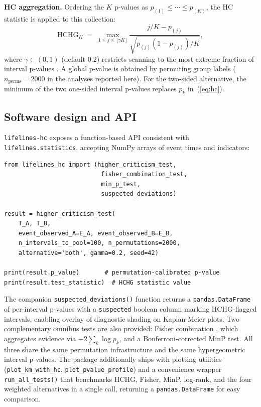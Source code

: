 \documentclass[unnumsec,webpdf,contemporary,large]{oup-authoring-template}
\begin{document}
\textbf{HC aggregation.}
Ordering the $K$ p-values as $p_{(1)} \leq \cdots \leq p_{(K)}$, the
HC statistic \citep{donoho2004,donoho2015special} is applied to this collection:
%
\begin{equation}\label{eq:hc}
  \mathrm{HCHG}_K
  \;=\;
  \max_{1 \leq j \leq \lfloor\gamma K\rfloor}
  \frac{j/K - p_{(j)}}{\sqrt{p_{(j)}\!\left(1 - p_{(j)}\right)/K}},
\end{equation}
%
where $\gamma \in (0,1)$ (default $0.2$) restricts scanning to the most
extreme fraction of interval p-values \citep{donoho2004,donoho2015special}. A global
p-value is obtained by permuting group labels
($n_\mathrm{perms} = 2000$ in the analyses reported here). For the two-sided alternative,
the minimum of the two one-sided interval p-values replaces $p_k$
in~(\ref{eq:hc}).

\subsection*{Software design and API}

\texttt{lifelines-hc} exposes a function-based API consistent with
\texttt{lifelines.statistics}, accepting NumPy arrays of event times and
indicators:

\begin{lstlisting}
from lifelines_hc import (higher_criticism_test,
                           fisher_combination_test,
                           min_p_test,
                           suspected_deviations)

result = higher_criticism_test(
    T_A, T_B,
    event_observed_A=E_A, event_observed_B=E_B,
    n_intervals_to_pool=100, n_permutations=2000,
    alternative='both', gamma=0.2, seed=42)

print(result.p_value)       # permutation-calibrated p-value
print(result.test_statistic)  # HCHG statistic value
\end{lstlisting}

\noindent
The companion \texttt{suspected\_deviations()} function returns a
\texttt{pandas.DataFrame} of per-interval p-values with a
\texttt{suspected} boolean column marking HCHG-flagged intervals,
enabling overlay of diagnostic shading on Kaplan-Meier plots. Two
complementary omnibus tests are also provided: Fisher combination
\citep{fisher1932}, which aggregates evidence via $-2\sum_k \log p_k$,
and a Bonferroni-corrected MinP test. All three share the same
permutation infrastructure and the same hypergeometric interval p-values.
The package additionally ships with plotting utilities
(\texttt{plot\_km\_with\_hc}, \texttt{plot\_pvalue\_profile}) and a
convenience wrapper \texttt{run\_all\_tests()} that benchmarks HCHG,
Fisher, MinP, log-rank, and the four weighted alternatives in a single
call, returning a \texttt{pandas.DataFrame} for easy comparison.
\end{document}
